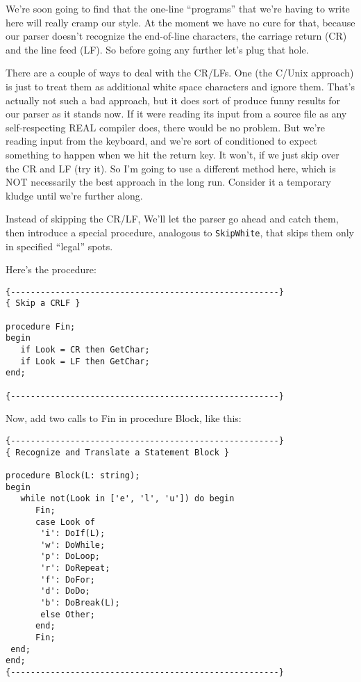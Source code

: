 We're soon going to find  that the one-line ``programs'' that we're having to write here will really cramp our style. At  the moment we  have  no  cure for that, because our parser doesn't recognize the end-of-line characters, the carriage return (CR) and the line feed (LF). So before going any further let's plug that hole.

There are  a  couple  of  ways to deal with the CR/LFs. One (the C/Unix approach) is just to  treat them as additional white space characters  and  ignore  them. That's actually not such a  bad approach, but  it  does  sort  of produce funny results for  our parser as  it  stands  now. If it were reading its input from a source file as  any  self-respecting  REAL  compiler  does, there would be no problem. But we're reading input from  the keyboard, and we're sort of conditioned  to expect something to happen when we hit the return key. It won't, if we just skip over the CR and LF  (try it). So I'm going to use a different method here, which is NOT necessarily the  best  approach in the long run. Consider it a temporary kludge until we're further along.

Instead of skipping the CR/LF, We'll let the parser go ahead and catch them, then  introduce  a  special  procedure, analogous to {\tt SkipWhite}, that skips them only in specified ``legal'' spots.

Here's the procedure:

\begin{verbatim}
{------------------------------------------------------}
{ Skip a CRLF }

procedure Fin;
begin
   if Look = CR then GetChar;
   if Look = LF then GetChar;
end;

{------------------------------------------------------}
\end{verbatim}

Now, add two calls to Fin in procedure Block, like this:

\begin{verbatim}
{------------------------------------------------------}
{ Recognize and Translate a Statement Block }

procedure Block(L: string);
begin
   while not(Look in ['e', 'l', 'u']) do begin
      Fin;
      case Look of
       'i': DoIf(L);
       'w': DoWhile;
       'p': DoLoop;
       'r': DoRepeat;
       'f': DoFor;
       'd': DoDo;
       'b': DoBreak(L);
       else Other;
      end;
      Fin;
 end;
end;
{------------------------------------------------------}
\end{verbatim}

